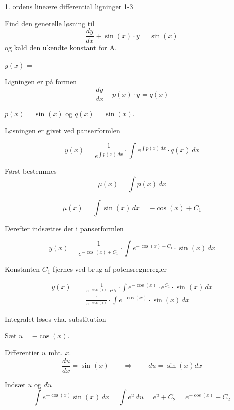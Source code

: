 \documentclass{article}
\begin{document}
\begin{exercise}{1. ordens lineære differential ligninger 1-3}
	
	
	Find den generelle løsning til
	\[
	\frac{dy}{dx} + \sin(x) \cdot y = \sin(x)
	\]
	og kald den ukendte konstant for A.
	
	$y(x)$ =  
	
	
	
	\hint
	
	Ligningen er på formen
	\[
	\frac{dy}{dx} + p(x) \cdot y = q(x)
	\]
	
	\hint
	
	$p(x)=\sin(x)$ og $q(x)=\sin(x)$.
	
	\hint
	
	Løsningen er givet ved panserformlen
	
	
	\hint
	
	\[
	y(x) = \frac{1}{e^{\int p(x) \, dx}} \cdot \int e^{\int p(x) \, dx}  \cdot q(x) \, dx
	\]
	
	\hint
	
	Først bestemmes 
	\[
	\mu(x) = \int p(x) \, dx
	\]
	
	\hint
	\[
	\mu(x) = \int \sin(x) \, dx = -\cos(x) + C_1
	\]
	
	\hint
	Derefter indsættes der i  panserformlen
	
	\hint
	
	\[
	y(x) = \frac{1}{e^{-\cos(x) + C_1}} \cdot \int e^{-\cos(x) + C_1}  \cdot \sin(x) \, dx
	\]
	
	
	\hint
	
	Konstanten $C_1$ fjernes ved brug af potensregneregler
	
	\hint
	\begin{align*}
	y(x) &= \frac{1}{e^{- \cos(x)} \cdot e^{C_1}} \cdot \int e^{-\cos(x)} \cdot e^{C_1}  \cdot \sin(x) \, dx  \\
	&= \frac{1}{e^{-\cos(x)}} \cdot \int e^{- \cos(x)}  \cdot \sin(x) \, dx
	\end{align*}
	
	\hint
	
	Integralet løses vha. substitution
	
	
	\hint
	Sæt $u = - \cos(x)$.
	
	\hint
	
	Differentier $u$ mht. $x$.
	\[
	\frac{du}{dx} = \sin(x) \qquad	\Rightarrow \qquad du = \sin(x) dx
	\]
	
	\hint 
	Indsæt $u$ og $du$
	\[
	\int e^{- \cos(x)} \sin(x) \, dx = \int e^{u} \, du = e^{u} + C_2 = e^{- \cos(x)} + C_2
	\]
	

\end{exercise}
\end{document}
